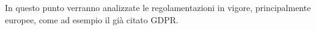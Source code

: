 In questo punto verranno analizzate le regolamentazioni in vigore, principalmente europee, come ad esempio il già citato GDPR.
